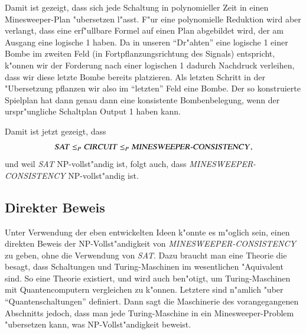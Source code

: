 Damit ist gezeigt, dass sich jede Schaltung in polynomieller Zeit in 
einen Minesweeper-Plan "ubersetzen l"asst. F"ur eine polynomielle
Reduktion wird aber verlangt, dass eine erf"ullbare Formel auf einen
Plan abgebildet wird, der am Ausgang eine logische 1 haben.
Da in unseren ``Dr"ahten'' eine logische 1 einer Bombe im zweiten
Feld (in Fortpflanzungsrichtung des Signals) entspricht, k"onnen
wir der Forderung nach einer logischen 1 dadurch Nachdruck verleihen,
dass wir diese letzte Bombe bereits platzieren. Als letzten Schritt
in der "Ubersetzung pflanzen wir also im ``letzten'' Feld eine Bombe.
Der so konstruierte Spielplan hat dann genau dann eine konsistente
Bombenbelegung, wenn der urspr"ungliche Schaltplan Output 1 haben kann.

Damit ist jetzt gezeigt, dass
\[
\text{\textsl{SAT}}\le_P
\text{\textsl{CIRCUIT}}\le_P\text{\textsl{MINESWEEPER-CONSISTENCY}},
\]
und weil \textsl{SAT} NP-vollst"andig ist, folgt auch, dass 
\textsl{MINESWEEPER-CONSISTENCY} NP-vollst"andig ist.

\subsection{Direkter Beweis}
Unter Verwendung der eben entwickelten Ideen k"onnte es m"oglich sein,
einen direkten Beweis der NP-Vollst"andigkeit von
\textsl{MINESWEEPER-CONSISTENCY} zu geben, ohne die Verwendung
von \textsl{SAT}. Dazu braucht man eine Theorie die besagt, dass
Schaltungen und Turing-Maschinen im wesentlichen "Aquivalent sind.
So eine Theorie existiert, und wird auch ben"otigt, um Turing-Maschinen
mit Quantencomputern vergleichen zu k"onnen. Letztere sind n"amlich
"uber ``Quantenschaltungen'' definiert. Dann sagt die Maschinerie des
vorangegangenen Abschnitts jedoch, dass man jede Turing-Maschine in
ein Minesweeper-Problem "ubersetzen kann, was NP-Vollst"andigkeit
beweist.
